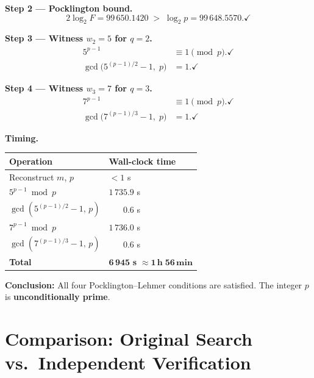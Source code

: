 \documentclass[11pt,a4paper]{article}
\theoremstyle{definition}
\theoremstyle{remark}
\begin{document}
\begin{resultbox}[title={\textbf{Verification Record} --- independent computation,
                          May 2026}]
\bigskip
\noindent\textbf{Step 2 --- Pocklington bound.}
\[
  2\log_2 F = 99\,650.1420 \;>\; \log_2 p = 99\,648.5570. \checkmark
\]

\bigskip
\noindent\textbf{Step 3 --- Witness $w_2 = 5$ for $q = 2$.}
\begin{align*}
  5^{p-1} &\equiv 1 \pmod{p}. \checkmark \\
  \gcd\!\bigl(5^{(p-1)/2}-1,\;p\bigr) &= 1. \checkmark
\end{align*}

\noindent\textbf{Step 4 --- Witness $w_3 = 7$ for $q = 3$.}
\begin{align*}
  7^{p-1} &\equiv 1 \pmod{p}. \checkmark \\
  \gcd\!\bigl(7^{(p-1)/3}-1,\;p\bigr) &= 1. \checkmark
\end{align*}

\bigskip
\noindent\textbf{Timing.}

\medskip
\begin{center}
\renewcommand{\arraystretch}{1.3}
\begin{tabular}{@{}ll@{}}
\toprule
Operation & Wall-clock time \\
\midrule
Reconstruct $m$, $p$ & $< 1$ s \\
$5^{p-1} \bmod p$            & $1\,735.9$ s \\
$\gcd(5^{(p-1)/2}-1,\,p)$    & $\phantom{1\,73}0.6$ s \\
$7^{p-1} \bmod p$            & $1\,736.0$ s \\
$\gcd(7^{(p-1)/3}-1,\,p)$    & $\phantom{1\,73}0.6$ s \\
\midrule
\textbf{Total} & $\mathbf{6\,945}$ \textbf{s}
                 $\approx \mathbf{1\,\text{h}\;56\,\text{min}}$ \\
\bottomrule
\end{tabular}
\end{center}

\bigskip
\noindent\textbf{Conclusion:}
All four Pocklington--Lehmer conditions are satisfied.
The integer $p$ is \textbf{unconditionally prime}.
\end{resultbox}

\section{Comparison: Original Search vs.\ Independent Verification}
\end{document}
